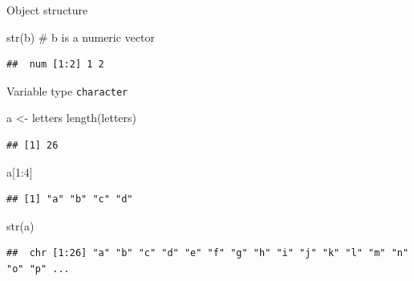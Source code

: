\documentclass[
  10pt,
  ignorenonframetext,
]{beamer}
\newenvironment{Shaded}{\begin{snugshade}}{\end{snugshade}}
\newcommand{\CommentTok}[1]{\textcolor[rgb]{0.50,0.62,0.50}{#1}}
\newcommand{\DecValTok}[1]{\textcolor[rgb]{0.86,0.86,0.80}{#1}}
\newcommand{\KeywordTok}[1]{\textcolor[rgb]{0.94,0.87,0.69}{#1}}
\newcommand{\NormalTok}[1]{\textcolor[rgb]{0.80,0.80,0.80}{#1}}
\newcommand{\OperatorTok}[1]{\textcolor[rgb]{0.94,0.94,0.82}{#1}}
\newcommand{\StringTok}[1]{\textcolor[rgb]{0.80,0.58,0.58}{#1}}
\begin{document}
\begin{frame}[fragile]{Object structure}
\protect\hypertarget{object-structure}{}

\begin{Shaded}
\begin{Highlighting}[]
\KeywordTok{str}\NormalTok{(b) }\CommentTok{# b is a numeric vector}
\end{Highlighting}
\end{Shaded}

\begin{verbatim}
##  num [1:2] 1 2
\end{verbatim}

\begin{block}{Variable type \texttt{character}}

\begin{Shaded}
\begin{Highlighting}[]
\NormalTok{a <-}\StringTok{ }\NormalTok{letters}
\KeywordTok{length}\NormalTok{(letters)}
\end{Highlighting}
\end{Shaded}

\begin{verbatim}
## [1] 26
\end{verbatim}

\begin{Shaded}
\begin{Highlighting}[]
\NormalTok{a[}\DecValTok{1}\OperatorTok{:}\DecValTok{4}\NormalTok{]}
\end{Highlighting}
\end{Shaded}

\begin{verbatim}
## [1] "a" "b" "c" "d"
\end{verbatim}

\begin{Shaded}
\begin{Highlighting}[]
\KeywordTok{str}\NormalTok{(a)}
\end{Highlighting}
\end{Shaded}

\begin{verbatim}
##  chr [1:26] "a" "b" "c" "d" "e" "f" "g" "h" "i" "j" "k" "l" "m" "n" "o" "p" ...
\end{verbatim}

\end{block}

\end{frame}
\end{document}
